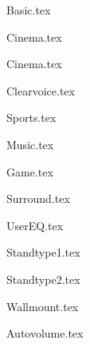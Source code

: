 {Basic.tex}




{Cinema.tex}

{Cinema.tex}

{Clearvoice.tex}

{Sports.tex}

{Music.tex}

{Game.tex}

{Surround.tex}


{UserEQ.tex}


{Standtype1.tex}

{Standtype2.tex}

{Wallmount.tex}


{Autovolume.tex}
